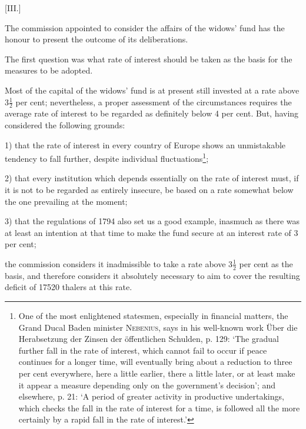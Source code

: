 \par\bigskip{}
\begin{center}
[III.]\par{}
\end{center}
\noindent\hspace*{\parindent}The commission appointed to consider the affairs of the widows' fund has the honour to present the outcome of its deliberations.

The first question was what rate of interest should be taken as the basis for the measures to be adopted.

Most of the capital of the widows' fund is at present still invested at a rate above \(3\tfrac{1}{2}\) per cent; nevertheless, a proper assessment of the circumstances requires the average rate of interest to be regarded as definitely below 4 per cent. But, having considered the following grounds:

1) that the rate of interest in every country of Europe shows an unmistakable tendency to fall further, despite individual fluctuations\footnote{One of the most enlightened statesmen, especially in financial matters, the Grand Ducal Baden minister \textsc{Nebenius}, says in his well-known work Über die Herabsetzung der Zinsen der öffentlichen Schulden, p. 129: ‘The gradual further fall in the rate of interest, which cannot fail to occur if peace continues for a longer time, will eventually bring about a reduction to three per cent everywhere, here a little earlier, there a little later, or at least make it appear a measure depending only on the government's decision’; and elsewhere, p. 21: ‘A period of greater activity in productive undertakings, which checks the fall in the rate of interest for a time, is followed all the more certainly by a rapid fall in the rate of interest.’};

2) that every institution which depends essentially on the rate of interest must, if it is not to be regarded as entirely insecure, be based on a rate somewhat below the one prevailing at the moment;

3) that the regulations of 1794 also set us a good example, inasmuch as there was at least an intention at that time to make the fund secure at an interest rate of 3 per cent;

\noindent the commission considers it inadmissible to take a rate above \(3\tfrac{1}{2}\) per cent as the basis, and therefore considers it absolutely necessary to aim to cover the resulting deficit of 17520 thalers at this rate.

